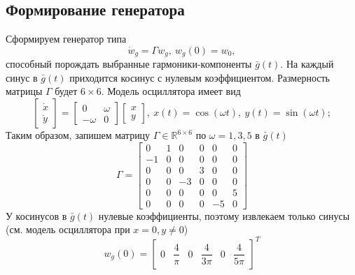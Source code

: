 \documentclass[a4paper, 12pt]{article}
\begin{document}
    \subsection{Формирование генератора}
    Сформируем генератор типа
    $$
    \dot{w}_g=\Gamma w_g,\ w_g(0)=w_0,
    $$
    способный порождать выбранные гармоники-компоненты $\bar{g}(t)$.
    На каждый синус в $\bar{g}(t)$ приходится косинус с нулевым коэффициентом.
    Размерность матрицы $\Gamma$ будет $6\times6$. Модель осциллятора имеет вид
    $$
    \begin{bmatrix}
        \dot{x}\\
        \dot{y}
    \end{bmatrix}=\begin{bmatrix}
        0 &\omega\\
        -\omega &0
    \end{bmatrix}\begin{bmatrix}
        x\\y
    \end{bmatrix},\ x(t)=\cos(\omega t),\ y(t)=\sin(\omega t);
    $$
    Таким образом, запишем матрицу $\Gamma\in\mathbb{R}^{6\times6}$ по $\omega=1,3,5$ в $\bar{g}(t)$
    $$
    \Gamma=\begin{bmatrix}
        0 &1 &0 &0 &0 &0\\
        -1 &0 &0 &0 &0 &0\\
        0 &0 &0 &3 &0 &0\\
        0 &0 &-3 &0 &0 &0\\
        0 &0 &0 &0 &0 &5\\
        0 &0 &0 &0 &-5 &0
    \end{bmatrix}
    $$
    У косинусов в $\bar{g}(t)$ нулевые коэффициенты, поэтому извлекаем только синусы (см. модель осциллятора при $x=0,y\neq0$)
    $$
    w_g(0)=\begin{bmatrix}
        0 &\dfrac{4}{\pi} &0 &\dfrac{4}{3\pi} &0 &\dfrac{4}{5\pi}
    \end{bmatrix}^T
    $$
\end{document}
